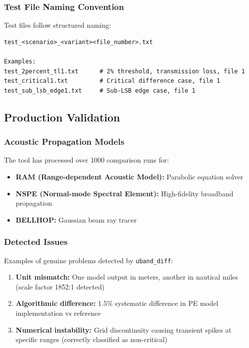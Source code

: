 \documentclass[11pt,letterpaper]{article}
\newcommand{\ubdiff}{\texttt{uband\_diff}}
\begin{document}
\subsubsection{Test File Naming Convention}

Test files follow structured naming:
\begin{verbatim}
test_<scenario>_<variant><file_number>.txt

Examples:
test_2percent_tl1.txt      # 2% threshold, transmission loss, file 1
test_critical1.txt         # Critical difference case, file 1
test_sub_lsb_edge1.txt     # Sub-LSB edge case, file 1
\end{verbatim}

\subsection{Production Validation}

\subsubsection{Acoustic Propagation Models}

The tool has processed over 1000 comparison runs for:
\begin{itemize}
    \item \textbf{RAM (Range-dependent Acoustic Model):} Parabolic equation solver
    \item \textbf{NSPE (Normal-mode Spectral Element):} High-fidelity broadband propagation
    \item \textbf{BELLHOP:} Gaussian beam ray tracer
\end{itemize}

\subsubsection{Detected Issues}

Examples of genuine problems detected by \ubdiff{}:

\begin{enumerate}
    \item \textbf{Unit mismatch:} One model output in meters, another in nautical miles (scale factor 1852:1 detected)
    \item \textbf{Algorithmic difference:} 1.5\% systematic difference in PE model implementation vs reference
    \item \textbf{Numerical instability:} Grid discontinuity causing transient spikes at specific ranges (correctly classified as non-critical)
\end{enumerate}
\end{document}

